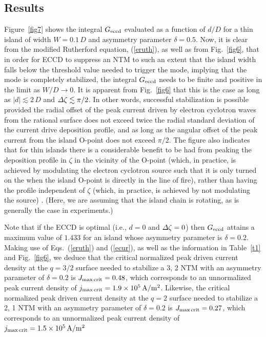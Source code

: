 \documentclass{iopjournal}
\begin{document}
\subsection{Results}
Figure~\ref{fig7} shows the integral $G_{\rm eccd}$ evaluated as a function of $d/D$ for a thin island of width $W=0.1\,D$ and asymmetry parameter
$\delta=0.5$. Now, it is clear from the modified Rutherford equation, (\ref{eruth}), as well as from  Fig.~\ref{fig6}, that in order for ECCD to suppress an NTM to
such an extent that the island width falls below the threshold value needed to trigger the mode, implying that the mode is completely
stabilized, the integral $G_{\rm eccd}$ needs to be finite and positive in the limit as $W/D\rightarrow 0$. It is apparent  from Fig.~\ref{fig6} that this is the case
as long as $|d|\lesssim 2\,D$ and ${\mit\Delta}\zeta\lesssim \pi/2$. In other words, successful stabilization is possible provided  the radial
offset of the peak current driven by electron cyclotron waves from the rational surface does not exceed twice the radial standard deviation of the current drive deposition profile, 
and as long as the angular offset of the peak current from the island O-point does not exceed $\pi/2$. The figure also indicates that for thin islands
there is a considerable benefit to be had from peaking the deposition profile in $\zeta$ in the vicinity of the O-point (which, in practice, is achieved by
modulating the electron cyclotron source such that it is only turned on the when the island O-point is directly in the line of fire), rather than having the profile independent of
$\zeta$ (which, in practice, is achieved by not modulating the source) \cite{ece6}. (Here, we are assuming that the island chain is rotating, as is generally the case in experiments.) 

Note that if the ECCD is optimal
(i.e., $d=0$ and ${\mit\Delta}\zeta=0$) then $G_{\rm eccd}$ attains a maximum value of $1.433$ for an island whose asymmetry parameter is $\delta=0.2$. 
Making use of Eqs.~(\ref{eruth}) and (\ref{ecur}),  as well as the information in Table~\ref{t1} and Fig.~\ref{fig6}, 
we deduce that the critical normalized peak driven current density at the $q=3/2$ surface needed to stabilize a 3, 2 NTM with an asymmetry parameter of $\delta = 0.2$ is $J_{\rm max\,crit}= 0.48$, which corresponds
to an unnormalized peak current density of $j_{\rm max\,crit}= 1.9\times 10^5\,{\rm A/m^2}$. Likewise, the critical normalized peak driven current density at the $q=2$ surface needed to stabilize a 2, 1 NTM with an asymmetry parameter of $\delta = 0.2$ is $J_{\rm max\,crit}= 0.27$, which corresponds
to an unnormalized peak current density of $j_{\rm max\,crit}= 1.5\times 10^5\,{\rm A/m^2}$
\end{document}

